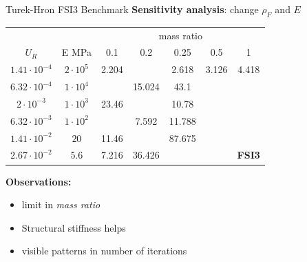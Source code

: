 \documentclass[10pt,t]{beamer}
\begin{document}
\begin{frame}{Turek-Hron FSI3 Benchmark}
\label{fsi2}
\textbf{Sensitivity analysis}: change $\rho_F$ and $E$ 


\footnotesize
\begin{center}
	\begin{tabular}{ c | c | c c c c c |} 
	&  & \multicolumn{5}{c|}{mass ratio} \\
		
	$U_R$ & E \si{MPa} & 0.1 & 0.2 & 0.25 & 0.5 & 1 \\
	\hline
    $1.41\cdot 10^{-4}$ & $2\cdot 10^{5}$ & \cellcolor{green!10}2.204 & \cellcolor{green!10} & \cellcolor{green!10}2.618 & \cellcolor{green!10}3.126 & \cellcolor{green!10}4.418 \\
	$6.32\cdot 10^{-4}$ & $1\cdot 10^{4}$ & \cellcolor{green!10} & \cellcolor{green!10}15.024 & \cellcolor{green!10}43.1 & \cellcolor{red!10} & \cellcolor{red!10} \\        
	$2\cdot 10^{-3}$ & $1\cdot 10^{3}$ & \cellcolor{green!10}23.46 & \cellcolor{green!10} & \cellcolor{green!10}10.78 & \cellcolor{red!10} & \cellcolor{red!10} \\
	$6.32\cdot 10^{-3}$ & $1\cdot 10^{2}$ & \cellcolor{green!10} & \cellcolor{green!10}7.592 & \cellcolor{green!10}11.788 & \cellcolor{red!10} & \cellcolor{red!10} \\
	$1.41\cdot 10^{-2}$ & $20$ & \cellcolor{green!10}11.46 & \cellcolor{green!10} & \cellcolor{green!10}87.675 & \cellcolor{red!10} & \cellcolor{red!10} \\
	$2.67\cdot 10^{-2}$ & $5.6$ & \cellcolor{green!10}7.216 & \cellcolor{green!10}36.426 & \cellcolor{red!10} & \cellcolor{red!10} & \cellcolor{red!10}\textbf{FSI3} \\
	\hline                        
	\end{tabular}
\end{center}

\vspace{0.5cm}

\normalsize

\textbf{Observations:}
\begin{itemize}
    \item limit in \textit{mass ratio}
    \item Structural stiffness helps
    \item visible patterns in number of iterations
\end{itemize}


\hyperlink{fsi1}{}

\end{frame}
\end{document}
